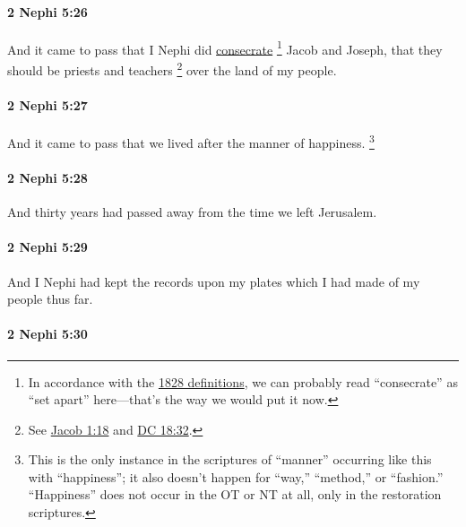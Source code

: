 		\paragraph{2 Nephi 5:26} %
			\label{2NEPHI-5-26}

			And it came to pass that I Nephi did \hyperref[CONSECRATION-1828]{consecrate}%
				\footnote{%
					\label{2NEPHI-5-26-consecrate}%
					In accordance with the \hyperref[CONSECRATION-1828]{1828 definitions}, we can probably read ``consecrate'' as ``set apart'' here---that's the way we would put it now.
					}
			Jacob and Joseph,
			that they should be priests and teachers%
				\footnote{%
					See \hyperref[JACOB-1-18]{Jacob 1:18} and \hyperref[DC18-32]{DC 18:32}.
					}
			over the land of my people.

		\paragraph{2 Nephi 5:27} %
			\label{2NEPHI-5-27}

			And it came to pass that we lived after the manner of happiness.%
			\footnote{%
				\label{2NEPHI-5-27-happiness}%
				This is the only instance in the scriptures of ``manner'' occurring like this with ``happiness''; it also doesn't happen for ``way,'' ``method,'' or ``fashion.'' ``Happiness'' does not occur in the OT or NT at all, only in the restoration scriptures.
				} 

		\paragraph{2 Nephi 5:28} %
			\label{2NEPHI-5-28}

			And thirty years had passed away from the time we left Jerusalem.

		\paragraph{2 Nephi 5:29} %
			\label{2NEPHI-5-29}

			And I Nephi had kept the records
			upon my plates which I had made
			of my people thus far.

		\paragraph{2 Nephi 5:30} %
			\label{2NEPHI-5-30}

